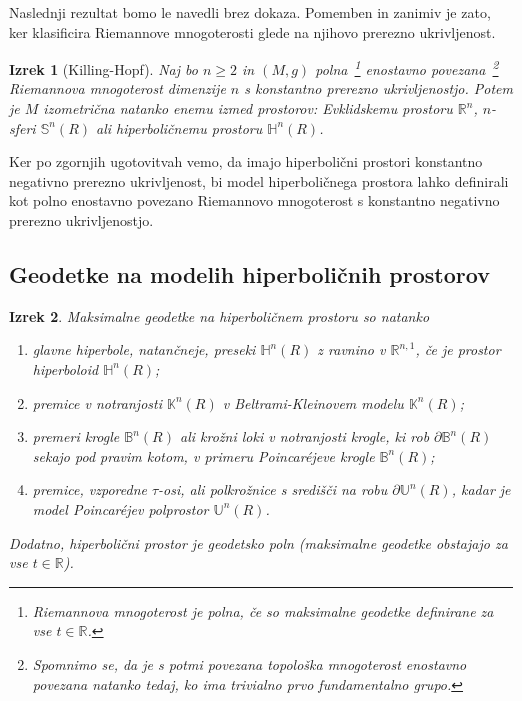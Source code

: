 \documentclass[a4paper]{article}
\newtheorem{izrek}{Izrek}
\begin{document}
Naslednji rezultat bomo le navedli brez dokaza. Pomemben in zanimiv je zato, ker klasificira Riemannove mnogoterosti glede na njihovo prerezno ukrivljenost.

\begin{izrek}[Killing-Hopf]
Naj bo $n \geq 2$ in $(M,g)$ polna~\footnote{Riemannova mnogoterost je \emph{polna}, če so maksimalne geodetke definirane za vse $t \in \mathbb{R}$.} enostavno povezana~\footnote{Spomnimo se, da je s potmi povezana topološka mnogoterost \emph{enostavno povezana} natanko tedaj, ko ima trivialno prvo fundamentalno grupo.} 
Riemannova mnogoterost dimenzije $n$ s konstantno prerezno ukrivljenostjo. Potem je $M$ izometrična natanko enemu izmed prostorov: Evklidskemu prostoru $\mathbb{R}^{n}$, $n$-sferi $\mathbb{S}^{n}(R)$ ali hiperboličnemu prostoru $\mathbb{H}^{n}(R)$.
\end{izrek}

Ker po zgornjih ugotovitvah vemo, da imajo hiperbolični prostori konstantno negativno prerezno ukrivljenost, bi model hiperboličnega prostora lahko definirali kot polno enostavno povezano Riemannovo mnogoterost s konstantno negativno prerezno ukrivljenostjo.

\subsection{Geodetke na modelih hiperboličnih prostorov}

\begin{izrek}
Maksimalne geodetke na hiperboličnem prostoru so natanko
\begin{enumerate}
\item glavne hiperbole, natančneje, preseki $\mathbb{H}^{n}(R)$ z ravnino v $\mathbb{R}^{n,1}$, če je prostor \textup{hiperboloid} $\mathbb{H}^{n}(R)$;
%
\item premice v notranjosti $\mathbb{K}^{n}(R)$ v \textup{Beltrami-Kleinovem modelu} $\mathbb{K}^{n}(R)$;
%
\item premeri krogle $\mathbb{B}^{n}(R)$ ali krožni loki v notranjosti krogle, ki rob $\partial\mathbb{B}^{n}(R)$ sekajo pod pravim kotom, v primeru \textup{Poincar\'ejeve krogle} $\mathbb{B}^{n}(R)$;
%
\item premice, vzporedne $\tau$-osi, ali polkrožnice s središči na robu $\partial\mathbb{U}^{n}(R)$, kadar je model \textup{Poincar\'ejev polprostor} $\mathbb{U}^{n}(R)$.
\end{enumerate}
Dodatno, hiperbolični prostor je geodetsko poln (maksimalne geodetke obstajajo za vse $t \in \mathbb{R}$).
\end{izrek}
\end{document}
